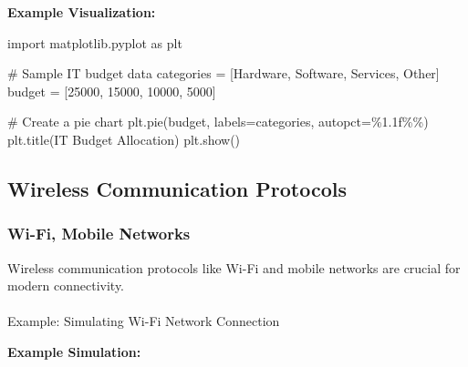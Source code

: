 \documentclass[
  letterpaper,
  DIV=11,
  numbers=noendperiod]{scrreprt}
\makeatletter
\let\oldparagraph\paragraph
\renewcommand{\paragraph}{
    \@ifstar
      \xxxParagraphStar
      \xxxParagraphNoStar
  }
\newcommand{\xxxParagraphStar}[1]{\oldparagraph*{#1}\mbox{}}
\newcommand{\xxxParagraphNoStar}[1]{\oldparagraph{#1}\mbox{}}
\newenvironment{Shaded}{\begin{snugshade}}{\end{snugshade}}
\newcommand{\CommentTok}[1]{\textcolor[rgb]{0.37,0.37,0.37}{#1}}
\newcommand{\DecValTok}[1]{\textcolor[rgb]{0.68,0.00,0.00}{#1}}
\newcommand{\ImportTok}[1]{\textcolor[rgb]{0.00,0.46,0.62}{#1}}
\newcommand{\NormalTok}[1]{\textcolor[rgb]{0.00,0.23,0.31}{#1}}
\newcommand{\OperatorTok}[1]{\textcolor[rgb]{0.37,0.37,0.37}{#1}}
\newcommand{\SpecialCharTok}[1]{\textcolor[rgb]{0.37,0.37,0.37}{#1}}
\newcommand{\StringTok}[1]{\textcolor[rgb]{0.13,0.47,0.30}{#1}}
\makeatother
\begin{document}
\textbf{Example Visualization:}

\begin{Shaded}
\begin{Highlighting}[]
\ImportTok{import}\NormalTok{ matplotlib.pyplot }\ImportTok{as}\NormalTok{ plt}

\CommentTok{\# Sample IT budget data}
\NormalTok{categories }\OperatorTok{=}\NormalTok{ [}\StringTok{\textquotesingle{}Hardware\textquotesingle{}}\NormalTok{, }\StringTok{\textquotesingle{}Software\textquotesingle{}}\NormalTok{, }\StringTok{\textquotesingle{}Services\textquotesingle{}}\NormalTok{, }\StringTok{\textquotesingle{}Other\textquotesingle{}}\NormalTok{]}
\NormalTok{budget }\OperatorTok{=}\NormalTok{ [}\DecValTok{25000}\NormalTok{, }\DecValTok{15000}\NormalTok{, }\DecValTok{10000}\NormalTok{, }\DecValTok{5000}\NormalTok{]}

\CommentTok{\# Create a pie chart}
\NormalTok{plt.pie(budget, labels}\OperatorTok{=}\NormalTok{categories, autopct}\OperatorTok{=}\StringTok{\textquotesingle{}}\SpecialCharTok{\%1.1f\%\%}\StringTok{\textquotesingle{}}\NormalTok{)}
\NormalTok{plt.title(}\StringTok{\textquotesingle{}IT Budget Allocation\textquotesingle{}}\NormalTok{)}
\NormalTok{plt.show()}
\end{Highlighting}
\end{Shaded}

\subsection{Wireless Communication
Protocols}\label{wireless-communication-protocols}

\subsubsection{Wi-Fi, Mobile Networks}\label{wi-fi-mobile-networks}

Wireless communication protocols like Wi-Fi and mobile networks are
crucial for modern connectivity.

\paragraph{Example: Simulating Wi-Fi Network
Connection}\label{example-simulating-wi-fi-network-connection}

\textbf{Example Simulation:}
\end{document}
